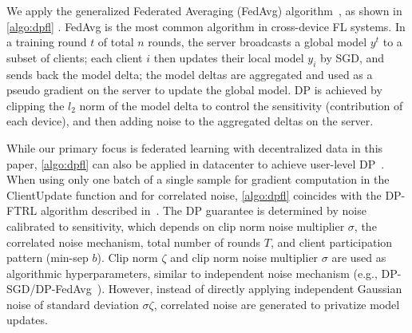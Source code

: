  \label{sec:background}



We apply the generalized Federated Averaging (FedAvg) algorithm~\citep{mcmahan2017fedavg,wang2021fieldguide}, as shown in \cref{algo:dpfl} . 
FedAvg is the most common algorithm in cross-device FL systems. In a training round $t$ of total $n$ rounds, the server broadcasts a global model $y^t$ to a subset of clients; each client $i$ then updates their local model $y_i$ by SGD, and sends back the model delta; the model deltas are aggregated and used as a pseudo gradient on the server to update the global model. DP is achieved by clipping the $l_2$ norm of the model delta to control the sensitivity (contribution of each device), and then adding noise to the aggregated deltas on the server.

While our primary focus is federated learning with decentralized data in this paper, \cref{algo:dpfl} can also be applied in datacenter to achieve user-level DP~\citep{xu2022learning,chua2024mind,charles2024fine}. When using only one batch of a single sample for gradient computation in the ClientUpdate function and \treeagg for correlated noise, \cref{algo:dpfl} coincides with the DP-FTRL algorithm described in~\citep{kairouz21practical}. The DP guarantee is determined by noise calibrated to sensitivity, which depends on clip norm noise multiplier $\sigma$, the correlated noise mechanism, total number of rounds $T$, and client participation pattern (min-sep $b$). Clip norm $\zeta$ and clip norm noise multiplier $\sigma$ are used as algorithmic hyperparameters, similar to independent noise mechanism (e.g., DP-SGD/DP-FedAvg~\citep{abadi2016deep,mcmahan18learning}). However, instead of directly applying independent Gaussian noise of standard deviation $\sigma \zeta$, correlated noise are generated to privatize model updates. 

